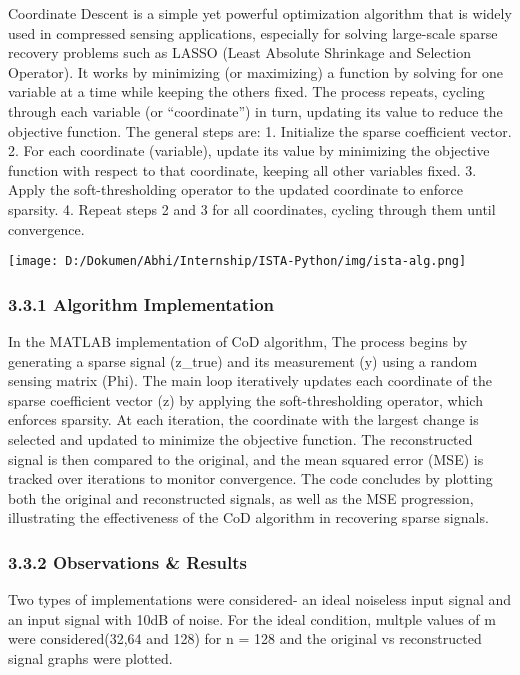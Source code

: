 \documentclass[
  letterpaper,
  DIV=11,
  numbers=noendperiod]{scrartcl}
\begin{document}
Coordinate Descent is a simple yet powerful optimization algorithm that
is widely used in compressed sensing applications, especially for
solving large-scale sparse recovery problems such as LASSO (Least
Absolute Shrinkage and Selection Operator). It works by minimizing (or
maximizing) a function by solving for one variable at a time while
keeping the others fixed. The process repeats, cycling through each
variable (or ``coordinate'') in turn, updating its value to reduce the
objective function. The general steps are: 1. Initialize the sparse
coefficient vector. 2. For each coordinate (variable), update its value
by minimizing the objective function with respect to that coordinate,
keeping all other variables fixed. 3. Apply the soft-thresholding
operator to the updated coordinate to enforce sparsity. 4. Repeat steps
2 and 3 for all coordinates, cycling through them until convergence.

\begin{center}
\texttt{[image: D:/Dokumen/Abhi/Internship/ISTA-Python/img/ista-alg.png]}
\end{center}

\subsubsection{3.3.1 Algorithm
Implementation}\label{algorithm-implementation-1}

In the MATLAB implementation of CoD algorithm, The process begins by
generating a sparse signal (z\_true) and its measurement (y) using a
random sensing matrix (Phi). The main loop iteratively updates each
coordinate of the sparse coefficient vector (z) by applying the
soft-thresholding operator, which enforces sparsity. At each iteration,
the coordinate with the largest change is selected and updated to
minimize the objective function. The reconstructed signal is then
compared to the original, and the mean squared error (MSE) is tracked
over iterations to monitor convergence. The code concludes by plotting
both the original and reconstructed signals, as well as the MSE
progression, illustrating the effectiveness of the CoD algorithm in
recovering sparse signals.

\subsubsection{3.3.2 Observations \&
Results}\label{observations-results-2}

Two types of implementations were considered- an ideal noiseless input
signal and an input signal with 10dB of noise. For the ideal condition,
multple values of m were considered(32,64 and 128) for n = 128 and the
original vs reconstructed signal graphs were plotted.
\end{document}
